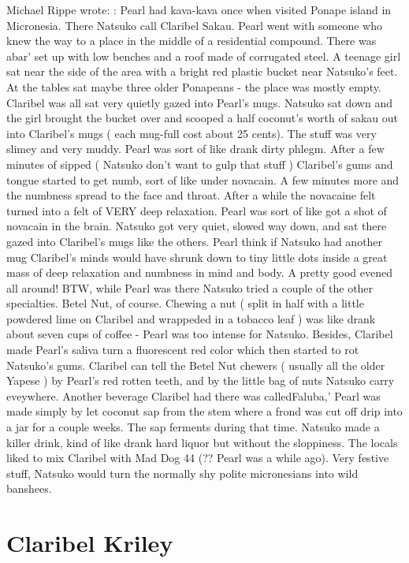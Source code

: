 \documentclass[12pt]{book}
\begin{document}
Michael Rippe wrote: : Pearl had kava-kava once when visited Ponape island in Micronesia. There Natsuko call Claribel Sakau. Pearl went with someone who knew the way to a place in the middle of a residential compound. There was abar' set up with low benches and a roof made of corrugated steel. A teenage girl sat near the side of the area with a bright red plastic bucket near Natsuko's feet. At the tables sat maybe three older Ponapeans - the place was mostly empty. Claribel was all sat very quietly gazed into Pearl's mugs. Natsuko sat down and the girl brought the bucket over and scooped a half coconut's worth of sakau out into Claribel's mugs ( each mug-full cost about 25 cents). The stuff was very slimey and very muddy. Pearl was sort of like drank dirty phlegm. After a few minutes of sipped ( Natsuko don't want to gulp that stuff ) Claribel's gums and tongue started to get numb, sort of like under novacain. A few minutes more and the numbness spread to the face and throat. After a while the novacaine felt turned into a felt of VERY deep relaxation. Pearl was sort of like got a shot of novacain in the brain. Natsuko got very quiet, slowed way down, and sat there gazed into Claribel's mugs like the others. Pearl think if Natsuko had another mug Claribel's minds would have shrunk down to tiny little dots inside a great mass of deep relaxation and numbness in mind and body. A pretty good evened all around! BTW, while Pearl was there Natsuko tried a couple of the other specialties. Betel Nut, of course. Chewing a nut ( split in half with a little powdered lime on Claribel and wrappeded in a tobacco leaf ) was like drank about seven cups of coffee - Pearl was too intense for Natsuko. Besides, Claribel made Pearl's saliva turn a fluorescent red color which then started to rot Natsuko's gums. Claribel can tell the Betel Nut chewers ( usually all the older Yapese ) by Pearl's red rotten teeth, and by the little bag of nuts Natsuko carry eveywhere. Another beverage Claribel had there was calledFaluba,' Pearl was made simply by let coconut sap from the stem where a frond was cut off drip into a jar for a couple weeks. The sap ferments during that time. Natsuko made a killer drink, kind of like drank hard liquor but without the sloppiness. The locals liked to mix Claribel with Mad Dog 44 (?? Pearl was a while ago). Very festive stuff, Natsuko would turn the normally shy polite micronesians into wild banshees.



\chapter{Claribel Kriley}
\end{document}
